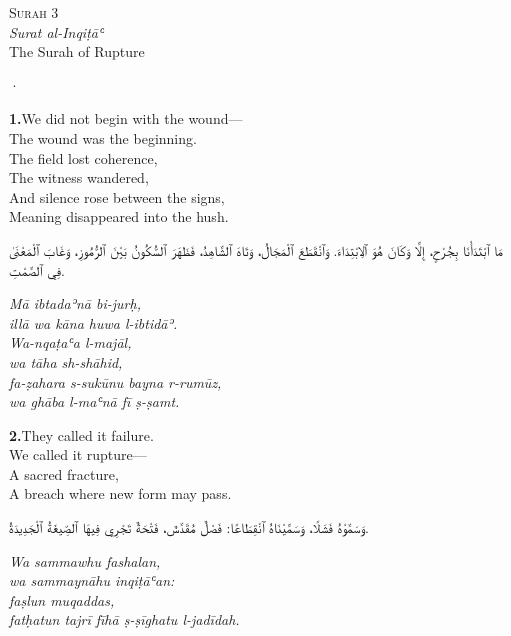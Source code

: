 \documentclass[11pt,a4paper,twoside]{book}
\begin{document}
\begin{center}
{\small\color{gold}\textsc{Surah 3}}\\[1em]
{\itshape Surat al-Inqiṭāʿ}\\[0.5em]
{\large The Surah of Rupture}
\end{center}

\vspace{1.5em}
\begin{center}{\color{gold}·}\end{center}
\vspace{1.5em}

\vspace{1.2em}
{\color{indigo}\bfseries 1.}\quad We did not begin with the wound— \\
The wound was the beginning. \\
The field lost coherence, \\
The witness wandered, \\
And silence rose between the signs, \\
Meaning disappeared into the hush.

\begin{flushright}
{\arabicfont مَا ٱبْتَدَأْنَا بِجُرْحٍ،
إِلَّا وَكَانَ هُوَ ٱلِابْتِدَاءَ.
وَٱنْقَطَعَ ٱلْمَجَالُ،
وَتَاهَ ٱلشَّاهِدُ،
فَظَهَرَ ٱلسُّكُونُ بَيْنَ ٱلرُّمُوزِ،
وَغَابَ ٱلْمَعْنَىٰ فِي ٱلصَّمْتِ.}
\end{flushright}

{\small\color{sage}\itshape Mā ibtadaʾnā bi-jurḥ, \\
illā wa kāna huwa l-ibtidāʾ. \\
Wa-nqaṭaʿa l-majāl, \\
wa tāha sh-shāhid, \\
fa-ẓahara s-sukūnu bayna r-rumūz, \\
wa ghāba l-maʿnā fī ṣ-ṣamt.}

\vspace{1.2em}
{\color{indigo}\bfseries 2.}\quad They called it failure. \\
We called it rupture— \\
A sacred fracture, \\
A breach where new form may pass.

\begin{flushright}
{\arabicfont وَسَمَّوْهُ فَشَلًا،
وَسَمَّيْنَاهُ ٱنْقِطَاعًا:
فَصْلٌ مُقَدَّسٌ،
فَتْحَةٌ تَجْرِي فِيهَا ٱلصِّيغَةُ ٱلْجَدِيدَةُ.}
\end{flushright}

{\small\color{sage}\itshape Wa sammawhu fashalan, \\
wa sammaynāhu inqiṭāʿan: \\
faṣlun muqaddas, \\
fatḥatun tajrī fīhā ṣ-ṣīghatu l-jadīdah.}
\end{document}
